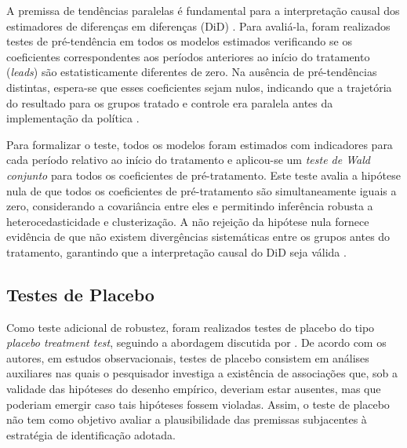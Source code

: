 \documentclass[12pt,a4paper,oneside]{article}
\begin{document}
A premissa de tendências paralelas é fundamental para a interpretação causal dos estimadores de diferenças em diferenças (DiD) \citep{angrist2009}. Para avaliá-la, foram realizados testes de pré-tendência em todos os modelos estimados verificando se os coeficientes correspondentes aos períodos anteriores ao início do tratamento (\emph{leads}) são estatisticamente diferentes de zero. Na ausência de pré-tendências distintas, espera-se que esses coeficientes sejam nulos, indicando que a trajetória do resultado para os grupos tratado e controle era paralela antes da implementação da política \citep{Borusyak2024}.

Para formalizar o teste, todos os modelos foram estimados com indicadores para cada período relativo ao início do tratamento e aplicou-se um \emph{teste de Wald conjunto} para todos os coeficientes de pré-tratamento. Este teste avalia a hipótese nula de que todos os coeficientes de pré-tratamento são simultaneamente iguais a zero, considerando a covariância entre eles e permitindo inferência robusta a heterocedasticidade e clusterização. A não rejeição da hipótese nula fornece evidência de que não existem divergências sistemáticas entre os grupos antes do tratamento, garantindo que a interpretação causal do DiD seja válida \citep{Borusyak2024}.

\subsection*{Testes de Placebo}

Como teste adicional de robustez, foram realizados testes de placebo do tipo \emph{placebo treatment test}, seguindo a abordagem discutida por \citep{Eggers2024}. De acordo com os autores, em estudos observacionais, testes de placebo consistem em análises auxiliares nas quais o pesquisador investiga a existência de associações que, sob a validade das hipóteses do desenho empírico, deveriam estar ausentes, mas que poderiam emergir caso tais hipóteses fossem violadas. Assim, o teste de placebo não tem como objetivo avaliar a plausibilidade das premissas subjacentes à estratégia de identificação adotada.
\end{document}
